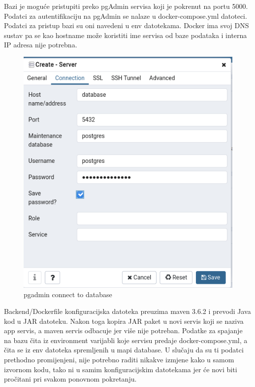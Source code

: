 			
			
				
		Bazi je moguće pristupiti preko pgAdmin servisa koji je pokrenut na portu 5000. Podatci za autentifikaciju na pgAdmin se nalaze u docker-compose.yml datoteci. Podatci za pristup bazi su oni navedeni u env datotekama. Docker ima svoj DNS sustav pa se kao hostname može koristiti ime servisa od baze podataka i interna IP adresa nije potrebna.		
				
		\begin{figure}[H]
					\includegraphics[scale=0.6]{figures/4-pgadmin.PNG}
					\centering
					\caption{pgadmin connect to database}
					\label{fig:sekv-uc13}
				\end{figure} 
												
				
		
		Backend/Dockerfile konfiguracijska datoteka preuzima maven 3.6.2 i prevodi Java kod u JAR datoteku. Nakon toga kopira JAR paket u novi servis koji se naziva app servis, a maven servis odbacuje jer više nije potreban. Podatke za spajanje na bazu čita iz environment varijabli koje servisu predaje docker-compose.yml, a čita se iz env datoteka spremljenih u mapi database. U slučaju da su ti podatci prethodno promijenjeni, nije potrebno raditi nikakve izmjene kako u samom izvornom kodu, tako ni u  samim konfiguracijskim datotekama jer će novi biti pročitani pri svakom ponovnom pokretanju.		
		
